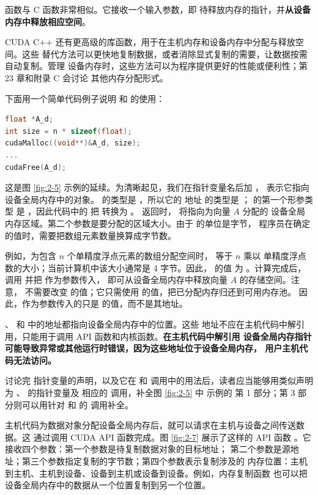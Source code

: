 函数与 C  函数非常相似。它接收一个输入参数，即
待释放内存的指针，并\textbf{从设备内存中释放相应空间}。

CUDA C++ 还有更高级的库函数，用于在主机内存和设备内存中分配与释放空间。这些
替代方法可以更快地复制数据，或者消除显式复制的需要，让数据按需自动复制。管理
设备内存时，这些方法可以为程序提供更好的性能或便利性；第 23 章和附录 C 会讨论
其他内存分配形式。

下面用一个简单代码例子说明  和  的使用：

\begin{lstlisting}[language=C++]
float *A_d;
int size = n * sizeof(float);
cudaMalloc((void**)&A_d, size);
...
cudaFree(A_d);
\end{lstlisting}

这是图 \ref{fig:2-5} 示例的延续。为清晰起见，我们在指针变量名后加 ，
表示它指向设备全局内存中的对象。 的类型是 ，所以它的
地址  的类型是 ； 的第一个形参类型
是 ，因此代码中的  把  转换为
。 返回时， 将指向为向量 $A$ 分配的
设备全局内存区域。第二个参数是要分配的区域大小。由于  的单位是字节，
程序员在确定  的值时，需要把数组元素数量换算成字节数。

例如，为包含 $n$ 个单精度浮点元素的数组分配空间时， 等于 $n$ 乘以
单精度浮点数的大小；当前计算机中该大小通常是 4 字节。因此， 的值
为 。计算完成后，调用  并把  作为参数传入，
即可从设备全局内存中释放向量 $A$ 的存储空间。注意， 不需要改变
 的值；它只需使用  的值，把已分配内存归还到可用内存池。
因此，作为参数传入的只是  的值，而不是其地址。

、 和  中的地址都指向设备全局内存中的位置。这些
地址不应在主机代码中解引用，只能用于调用 API 函数和内核函数。\textbf{在主机代码中解引用
设备全局内存指针可能导致异常或其他运行时错误，因为这些地址位于设备全局内存，
用户主机代码无法访问。}

讨论完  指针变量的声明，以及它在  和 
调用中的用法后，读者应当能够用类似声明为 、 的指针变量及
相应的  调用，补全图 \ref{fig:2-5} 中  示例的
第 1 部分；第 3 部分则可以用针对  和  的 
调用补全。

主机代码为数据对象分配设备全局内存后，就可以请求在主机与设备之间传送数据。这
通过调用 CUDA API 函数完成。图 \ref{fig:2-7} 展示了这样的 API 函数
。它接收四个参数：第一个参数是待复制数据对象的目标地址；
第二个参数是源地址；第三个参数指定复制的字节数；第四个参数表示复制涉及的
内存位置：主机到主机、主机到设备、设备到主机或设备到设备。例如，内存复制函数
也可以把设备全局内存中的数据从一个位置复制到另一个位置。

